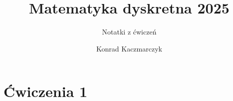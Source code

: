 \documentclass[11pt]{scrartcl}
\author{Konrad Kaczmarczyk}
\begin{document}
    \title{Matematyka dyskretna 2025}
    \subtitle{Notatki z ćwiczeń}
    \maketitle
    
    \section{Ćwiczenia 1}

    
\end{document}
